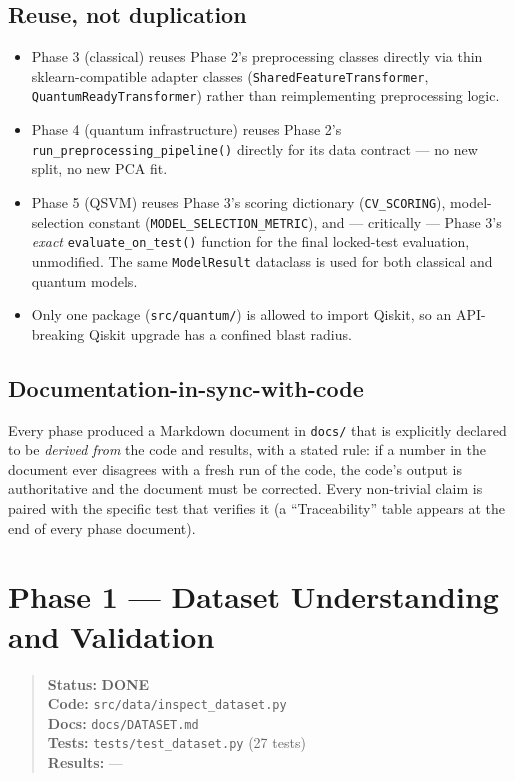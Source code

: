\documentclass[11pt,a4paper]{article}
\newcommand{\code}[1]{\texttt{\small #1}}
\newcommand{\done}{\textcolor{donecolor}{\textbf{DONE}}}
\newcommand{\phasestatus}[5]{%
\begin{quote}\small\raggedright
\textbf{Status:} #1 \\
\textbf{Code:} #2 \\
\textbf{Docs:} #3 \\
\textbf{Tests:} #4 \\
\textbf{Results:} #5
\end{quote}}
\begin{document}
\subsection{Reuse, not duplication}
\begin{itemize}[leftmargin=1.4em]
  \item Phase 3 (classical) reuses Phase 2's preprocessing classes directly via thin sklearn-compatible adapter classes (\code{SharedFeatureTransformer}, \code{QuantumReadyTransformer}) rather than reimplementing preprocessing logic.
  \item Phase 4 (quantum infrastructure) reuses Phase 2's \code{run\_preprocessing\_pipeline()} directly for its data contract --- no new split, no new PCA fit.
  \item Phase 5 (QSVM) reuses Phase 3's scoring dictionary (\code{CV\_SCORING}), model-selection constant (\code{MODEL\_SELECTION\_METRIC}), and --- critically --- Phase 3's \emph{exact} \code{evaluate\_on\_test()} function for the final locked-test evaluation, unmodified. The same \code{ModelResult} dataclass is used for both classical and quantum models.
  \item Only one package (\code{src/quantum/}) is allowed to import Qiskit, so an API-breaking Qiskit upgrade has a confined blast radius.
\end{itemize}

\subsection{Documentation-in-sync-with-code}
Every phase produced a Markdown document in \code{docs/} that is explicitly declared to be \emph{derived from} the code and results, with a stated rule: if a number in the document ever disagrees with a fresh run of the code, the code's output is authoritative and the document must be corrected. Every non-trivial claim is paired with the specific test that verifies it (a ``Traceability'' table appears at the end of every phase document).

\section{Phase 1 --- Dataset Understanding and Validation}
\label{sec:phase1}

\phasestatus{\done}{\code{src/data/inspect\_dataset.py}}{\code{docs/DATASET.md}}{\code{tests/test\_dataset.py} (27 tests)}{---}
\end{document}
